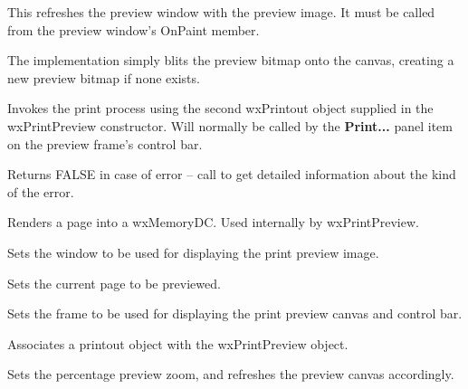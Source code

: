 \label{wxprintpreviewpaintpage}


This refreshes the preview window with the preview image.
It must be called from the preview window's OnPaint member.

The implementation simply blits the preview bitmap onto
the canvas, creating a new preview bitmap if none exists.

\label{wxprintpreviewprint}


Invokes the print process using the second wxPrintout object
supplied in the wxPrintPreview constructor.
Will normally be called by the {\bf Print...} panel item on the
preview frame's control bar.

Returns FALSE in case of error -- call
 to get detailed
information about the kind of the error.

\label{wxprintpreviewrenderpage}


Renders a page into a wxMemoryDC. Used internally by wxPrintPreview.

\label{wxprintpreviewsetcanvas}


Sets the window to be used for displaying the print preview image.

\label{wxprintpreviewsetcurrentpage}


Sets the current page to be previewed.

\label{wxprintpreviewsetframe}


Sets the frame to be used for displaying the print preview canvas
and control bar.

\label{wxprintpreviewsetprintout}


Associates a printout object with the wxPrintPreview object.

\label{wxprintpreviewsetzoom}


Sets the percentage preview zoom, and refreshes the preview canvas
accordingly.

